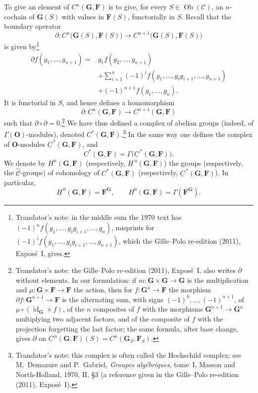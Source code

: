 To give an element of \(C^n(\mathbf G,\mathbf F)\) is to give, for every
\(S\in\operatorname{Ob}(\mathscr C)\), an \(n\)-cochain of
\(\mathbf G(S)\) with values in \(\mathbf F(S)\), functorially in \(S\).
Recall that the boundary operator
\[
  \partial:C^n\bigl(\mathbf G(S),\mathbf F(S)\bigr)
    \longrightarrow
    C^{n+1}\bigl(\mathbf G(S),\mathbf F(S)\bigr)
\]
is given by\footnote{Translator's note: in the middle sum the 1970 text has
\((-1)^nf(g_1,\ldots,g_ig_{i+1},\ldots,g_n)\), misprints for
\((-1)^if(g_1,\ldots,g_ig_{i+1},\ldots,g_{n+1})\), which the Gille--Polo
re-edition (2011), Exposé~I, gives.}
\begin{align*}
  \partial f(g_1,\ldots,g_{n+1})
    ={}&g_1f(g_2,\ldots,g_{n+1}) \\
     &+\sum_{i=1}^{n}(-1)^i
       f(g_1,\ldots,g_i g_{i+1},\ldots,g_{n+1}) \\
     &+(-1)^{n+1}f(g_1,\ldots,g_n).
\end{align*}
It is functorial in \(S\), and hence defines a homomorphism
\[
  \partial:C^n(\mathbf G,\mathbf F)
    \longrightarrow C^{n+1}(\mathbf G,\mathbf F)
\]
such that \(\partial\circ\partial=0\).\footnote{Translator's note: the Gille--Polo re-edition (2011), Exposé~I, also writes
\(\partial\) without elements. In our formulation: if
\(m:\mathbf G\times\mathbf G\to\mathbf G\) is the multiplication and
\(\mu:\mathbf G\times\mathbf F\to\mathbf F\) the action, then for
\(f:\mathbf G^n\to\mathbf F\) the morphism
\(\partial f:\mathbf G^{n+1}\to\mathbf F\) is the alternating sum, with signs
\((-1)^0,\ldots,(-1)^{n+1}\), of \(\mu\circ(\operatorname{id}_{\mathbf G}\times f)\),
of the \(n\) composites of \(f\) with the morphisms
\(\mathbf G^{n+1}\to\mathbf G^n\) multiplying two adjacent factors, and of
the composite of \(f\) with the projection forgetting the last factor; the
same formula, after base change, gives \(\partial\) on
\(\underline C^{\,n}(\mathbf G,\mathbf F)(S)=C^n(\mathbf G_S,\mathbf F_S)\).}
We have thus defined a complex of
abelian groups (indeed, of \(\Gamma(\mathbf O)\)-modules), denoted
\(C^*(\mathbf G,\mathbf F)\).\footnote{Translator's note: this complex is often called the Hochschild
complex; see M.~Demazure and P.~Gabriel, \textit{Groupes algébriques},
tome~I, Masson and North-Holland, 1970, II, \S3 (a reference given in the
Gille--Polo re-edition (2011), Exposé~I).} In the same way one defines the complex of
\(\mathbf O\)-modules \(\underline C^{\,*}(\mathbf G,\mathbf F)\), and
\[
  C^*(\mathbf G,\mathbf F)
    =\Gamma\bigl(\underline C^{\,*}(\mathbf G,\mathbf F)\bigr).
\]
We denote by \(H^n(\mathbf G,\mathbf F)\) (respectively,
\(\underline H^{\,n}(\mathbf G,\mathbf F)\)) the groups (respectively,
the \(\widehat{\mathscr C}\)-groups) of cohomology of
\(C^*(\mathbf G,\mathbf F)\) (respectively,
\(\underline C^{\,*}(\mathbf G,\mathbf F)\)). In particular,
\[
  \underline H^{\,0}(\mathbf G,\mathbf F)=\mathbf F^{\mathbf G},
  \qquad
  H^0(\mathbf G,\mathbf F)=\Gamma(\mathbf F^{\mathbf G}).
\]

